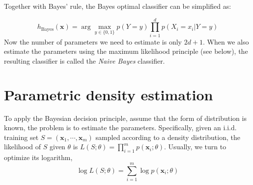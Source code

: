 \documentclass{article}
\begin{document}
	Together with Bayes' rule, the Bayes optimal classifier can be simplified as:
	
	\begin{equation}
	h_{\mathrm{Bayes}}(\bm{x}) = \arg\max\limits_{y\in\{0,1\}} p (Y=y) \prod_{i=1}^d p (X_i=x_i|Y=y)
	\end{equation}
Now the number of parameters we need to estimate is only $2d + 1$. When we also estimate the parameters using the maximum likelihood principle (see below), the resulting classifier is called the \textit{Naive Bayes} classifier.

\section{Parametric density estimation}

	To apply the Bayesian decision principle, assume that the form of distribution is known, the problem is to estimate the parameters. Specifically, given an i.i.d. training set $S = (\bm{x}_1,\cdots,\bm{x}_m)$ sampled according to a density distribution, the likelihood of $S$ given $\theta$ is $L(S;\theta) = \prod_{i=1}^m  p(\bm{x}_i;\theta)$.	Usually, we turn to optimize its logarithm,
	\begin{equation}
	\log L(S;\theta) = \sum_{i=1}^m \log p(\bm{x}_i;\theta)
	\end{equation}
		
\end{document}

